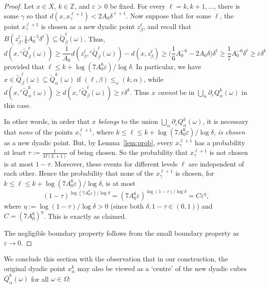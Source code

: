 \documentclass{amsart}
\numberwithin{equation}{section}
\theoremstyle{plain}
\theoremstyle{definition}
\theoremstyle{remark}
\begin{document}
{{\begin{proof}
Let $x\in X$, $k\in{\mathbb{Z}}$, and $\varepsilon>0$ be fixed.
For every $\ell=k,k+1,\ldots$, there is some $\gamma$ so that $d(x,x^{\ell+1}_\gamma)<2A_0\delta^{\ell+1}$. Now suppose that for some $\ell$, the point $x^{\ell+1}_\gamma$ is chosen as a new dyadic point $z^\ell_\beta$, and recall that $B(z^\ell_\beta,\tfrac16 A_0^{-5}\delta^\ell)\subseteq\tilde{Q}^\ell_\beta(\omega)$. Thus,
\begin{equation*}
  d(x,{}^c\tilde{Q}^\ell_\beta(\omega))\geq
  \frac{1}{A_0}d(z^\ell_\beta,{}^c\tilde{Q}^\ell_\beta(\omega))-d(x,z^\ell_\beta)
  \geq\Big(\frac16 A_0^{-6}-2A_0\delta\Big)\delta^\ell
  \geq\frac17A_0^{-6}\delta^\ell
  \geq\varepsilon\delta^k
\end{equation*}
provided that $\ell\leq k+\log(7A_0^6\varepsilon)/\log\delta$. In particular, we have $x\in \tilde{Q}^\ell_\beta(\omega)\subseteq\tilde{Q}^k_\alpha(\omega)$ if $(\ell,\beta)\leq_\omega(k,\alpha)$, while $d(x,{}^c\tilde{Q}^k_\alpha(\omega))\geq d(x,{}^c\tilde{Q}^\ell_\beta(\omega))\geq\varepsilon\delta^k$. Thus $x$ \emph{cannot} be in $\bigcup_\alpha\partial_{\varepsilon}Q^k_\alpha(\omega)$ in this case.

In other words, in order that $x$ \emph{belongs} to the union $\bigcup_\alpha\partial_{\varepsilon}Q^k_\alpha(\omega)$, it is necessary that \emph{none} of the points $x^{\ell+1}_\gamma$, where $k\leq\ell\leq k+\log(7A_0^6\varepsilon)/\log\delta$, \emph{is chosen} as a new dyadic point. But, by Lemma~\ref{lem:prob}, every $x^{\ell+1}_\gamma$ has a probability at least $\tau:=\frac{1}{M(L+1)}$ of being chosen. So the probability that $x^{\ell+1}_\gamma$ is not chosen is at most $1-\tau$. Moreover, these events for different levels $\ell$ are independent of each other. Hence the probability that none of the $x^{\ell+1}_\gamma$ is chosen, for $k\leq\ell\leq k+\log(7A_0^6\varepsilon)/\log\delta$, is at most
\begin{equation*}
  (1-\tau)^{\log(7A_0^6\varepsilon)/\log\delta}
  =(7A_0^6\varepsilon)^{\log(1-\tau)/\log\delta}
  =C\varepsilon^{\eta},
\end{equation*}
where $\eta:=\log(1-\tau)/\log\delta>0$ (since both $\delta,1-\tau\in(0,1)$) and $C=(7A_0^6)^{\eta}$. This is exactly as claimed.

The negligible boundary property follows from the small boundary property as $\varepsilon\to 0$.
\end{proof}

We conclude this section with the observation that in our construction, the original dyadic point $x^k_\alpha$ may also be viewed as a `centre' of the new dyadic cubes $\bar{Q}^k_\alpha(\omega)$ for all $\omega\in\Omega$:

}}
\end{document}
